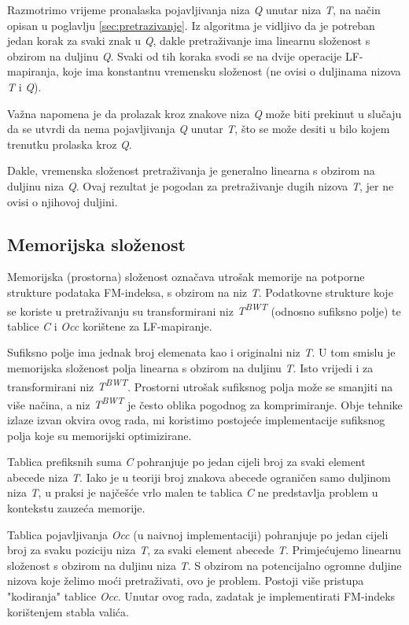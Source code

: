\documentclass[times, utf8, seminar, numeric]{fer}
\begin{document}
Razmotrimo vrijeme pronalaska pojavljivanja niza \textit{Q} unutar niza \textit{T}, na
način opisan u poglavlju \ref{sec:pretrazivanje}. Iz algoritma je vidljivo da je
potreban jedan korak za svaki znak u \textit{Q}, dakle pretraživanje ima linearnu
složenost s obzirom na duljinu \textit{Q}. Svaki od tih koraka svodi se na dvije
operacije LF-mapiranja, koje ima konstantnu vremensku složenost (ne ovisi o duljinama
nizova \textit{T} i \textit{Q}).

Važna napomena je da prolazak kroz znakove niza \textit{Q} može biti prekinut u slučaju
da se utvrdi da nema pojavljivanja \textit{Q} unutar \textit{T}, što se može desiti
u bilo kojem trenutku prolaska kroz \textit{Q}.

Dakle, vremenska složenost pretraživanja je generalno linearna s obzirom na duljinu
niza \textit{Q}. Ovaj rezultat je pogodan za pretraživanje dugih nizova \textit{T},
jer ne ovisi o njihovoj duljini.

\subsection{Memorijska složenost}

Memorijska (prostorna) složenost označava utrošak memorije na potporne
strukture podataka FM-indeksa, s obzirom na niz \textit{T}.
Podatkovne strukture koje se koriste u pretraživanju su transformirani niz
\textit{T\textsuperscript{BWT}} (odnosno sufiksno polje) te tablice \textit{C}
i \textit{Occ} korištene za LF-mapiranje.

Sufiksno polje ima jednak broj elemenata kao i originalni niz \textit{T}. U
tom smislu je memorijska složenost polja linearna s obzirom na duljinu \textit{T}.
Isto vrijedi i za transformirani niz \textit{T\textsuperscript{BWT}}. Prostorni
utrošak sufiksnog polja može se smanjiti na više načina, a niz \textit{T\textsuperscript{BWT}}
je često oblika pogodnog za komprimiranje. Obje tehnike izlaze izvan okvira
ovog rada, mi koristimo postojeće implementacije sufiksnog polja koje su memorijski
optimizirane.

Tablica prefiksnih suma \textit{C} pohranjuje po jedan cijeli broj za svaki
element abecede niza \textit{T}. Iako je u teoriji broj znakova abecede ograničen samo
duljinom niza \textit{T}, u praksi je najčešće vrlo malen te tablica \textit{C}
ne predstavlja problem u kontekstu zauzeća memorije.

Tablica pojavljivanja \textit{Occ} (u naivnoj implementaciji) pohranjuje po
jedan cijeli broj za svaku poziciju niza \textit{T}, za svaki element abecede \textit{T}.
Primjećujemo linearnu složenost s obzirom na duljinu niza \textit{T}. S obzirom
na potencijalno ogromne duljine nizova koje želimo moći pretraživati, ovo je problem.
Postoji više pristupa "kodiranja" tablice \textit{Occ}. Unutar ovog rada, zadatak
je implementirati FM-indeks korištenjem stabla valića.
\end{document}
